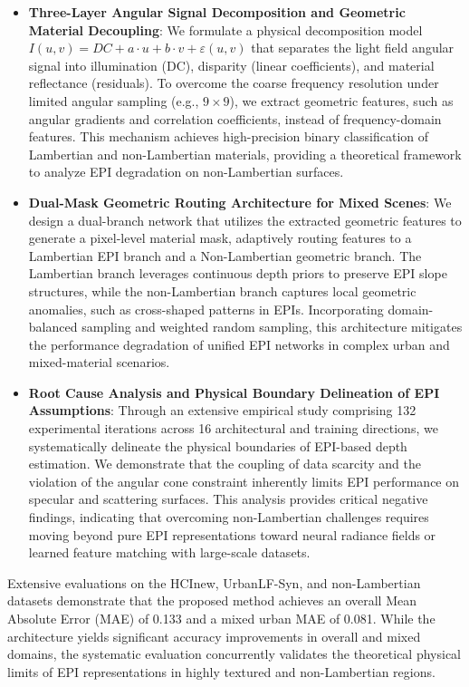\documentclass[lettersize,journal]{IEEEtran}
\begin{document}
\begin{itemize}
\item \textbf{Three-Layer Angular Signal Decomposition and Geometric Material Decoupling}: We formulate a physical decomposition model $I(u,v) = DC + a \cdot u + b \cdot v + \varepsilon(u,v)$ that separates the light field angular signal into illumination (DC), disparity (linear coefficients), and material reflectance (residuals). To overcome the coarse frequency resolution under limited angular sampling (e.g., $9 \times 9$), we extract geometric features, such as angular gradients and correlation coefficients, instead of frequency-domain features. This mechanism achieves high-precision binary classification of Lambertian and non-Lambertian materials, providing a theoretical framework to analyze EPI degradation on non-Lambertian surfaces.
\item \textbf{Dual-Mask Geometric Routing Architecture for Mixed Scenes}: We design a dual-branch network that utilizes the extracted geometric features to generate a pixel-level material mask, adaptively routing features to a Lambertian EPI branch and a Non-Lambertian geometric branch. The Lambertian branch leverages continuous depth priors to preserve EPI slope structures, while the non-Lambertian branch captures local geometric anomalies, such as cross-shaped patterns in EPIs. Incorporating domain-balanced sampling and weighted random sampling, this architecture mitigates the performance degradation of unified EPI networks in complex urban and mixed-material scenarios.
\item \textbf{Root Cause Analysis and Physical Boundary Delineation of EPI Assumptions}: Through an extensive empirical study comprising 132 experimental iterations across 16 architectural and training directions, we systematically delineate the physical boundaries of EPI-based depth estimation. We demonstrate that the coupling of data scarcity and the violation of the angular cone constraint inherently limits EPI performance on specular and scattering surfaces. This analysis provides critical negative findings, indicating that overcoming non-Lambertian challenges requires moving beyond pure EPI representations toward neural radiance fields or learned feature matching with large-scale datasets.
\end{itemize}

Extensive evaluations on the HCInew, UrbanLF-Syn, and non-Lambertian datasets demonstrate that the proposed method achieves an overall Mean Absolute Error (MAE) of 0.133 and a mixed urban MAE of 0.081. While the architecture yields significant accuracy improvements in overall and mixed domains, the systematic evaluation concurrently validates the theoretical physical limits of EPI representations in highly textured and non-Lambertian regions.
\end{document}
